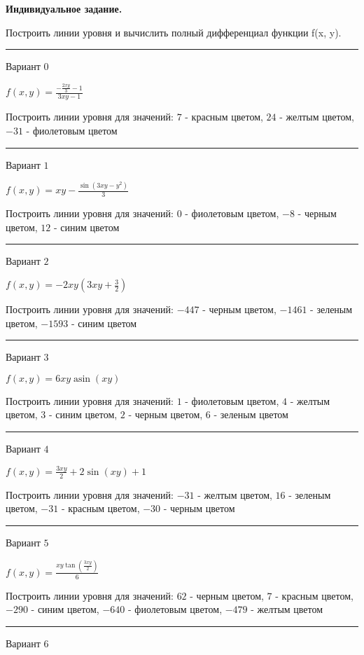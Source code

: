 \documentclass[11pt]{report}
\begin{document}
\pagestyle{empty}
{\bf Индивидуальное задание.}

Построить линии уровня и вычислить полный дифференциал функции f(x, y).

\begin{center}
\noindent\rule{8cm}{0.4pt}
\end{center}
Вариант $0$


$f(x, y) = \frac{- \frac{2 x y}{3} - 1}{3 x y - 1}$

Построить линии уровня для значений: $7$ - красным цветом, $24$ - желтым цветом, $-31$ - фиолетовым цветом
\begin{center}
\noindent\rule{8cm}{0.4pt}
\end{center}
Вариант $1$


$f(x, y) = x y - \frac{\sin{\left(3 x y - y^{2} \right)}}{3}$

Построить линии уровня для значений: $0$ - фиолетовым цветом, $-8$ - черным цветом, $12$ - синим цветом
\begin{center}
\noindent\rule{8cm}{0.4pt}
\end{center}
Вариант $2$


$f(x, y) = - 2 x y \left(3 x y + \frac{3}{2}\right)$

Построить линии уровня для значений: $-447$ - черным цветом, $-1461$ - зеленым цветом, $-1593$ - синим цветом
\begin{center}
\noindent\rule{8cm}{0.4pt}
\end{center}
Вариант $3$


$f(x, y) = 6 x y \operatorname{asin}{\left(x y \right)}$

Построить линии уровня для значений: $1$ - фиолетовым цветом, $4$ - желтым цветом, $3$ - синим цветом, $2$ - черным цветом, $6$ - зеленым цветом
\begin{center}
\noindent\rule{8cm}{0.4pt}
\end{center}
Вариант $4$


$f(x, y) = \frac{3 x y}{2} + 2 \sin{\left(x y \right)} + 1$

Построить линии уровня для значений: $-31$ - желтым цветом, $16$ - зеленым цветом, $-31$ - красным цветом, $-30$ - черным цветом
\begin{center}
\noindent\rule{8cm}{0.4pt}
\end{center}
Вариант $5$


$f(x, y) = \frac{x y \tan{\left(\frac{3 x y}{2} \right)}}{6}$

Построить линии уровня для значений: $62$ - черным цветом, $7$ - красным цветом, $-290$ - синим цветом, $-640$ - фиолетовым цветом, $-479$ - желтым цветом
\begin{center}
\noindent\rule{8cm}{0.4pt}
\end{center}
Вариант $6$
\end{document}
